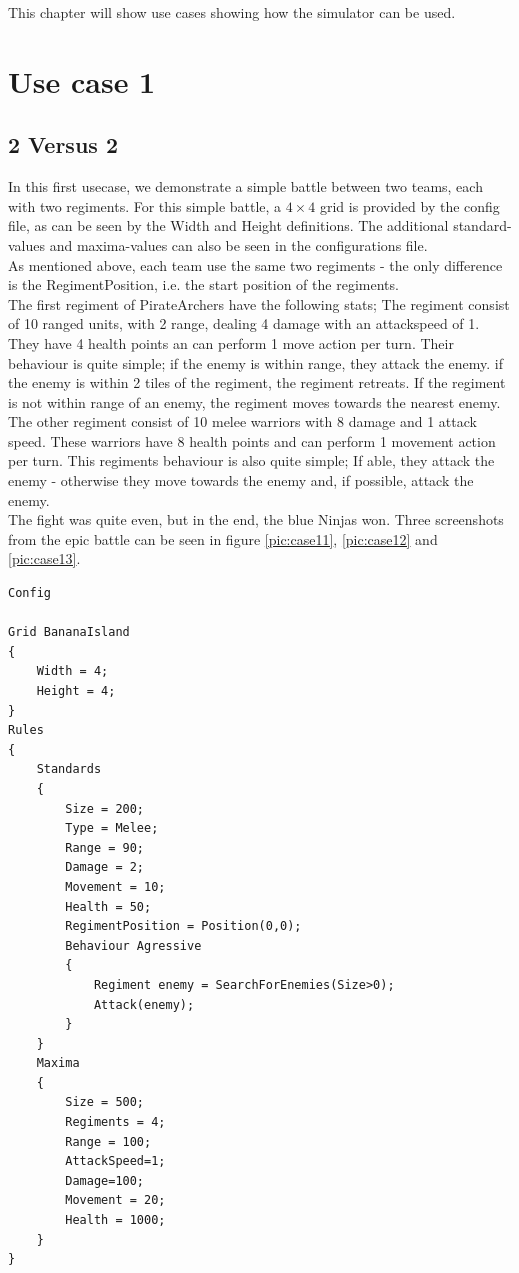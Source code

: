 This chapter will show use cases showing how the simulator can be used.

\section{Use case 1}\label{sec:usecase1}
	\subsection*{2 Versus 2}
	In this first usecase, we demonstrate a simple battle between two teams, each with two regiments. For this simple battle, a $4\times4$ grid is provided by the config file, as can be seen by the Width and Height definitions. The additional standard-values and maxima-values can also be seen in the configurations file.\\
	As mentioned above, each team use the same two regiments - the only difference is the RegimentPosition, i.e. the start position of the regiments. \\
	The first regiment of PirateArchers have the following stats; The regiment consist of 10 ranged units, with 2 range, dealing 4 damage with an attackspeed of 1. They have 4 health points an can perform 1 move action per turn. Their behaviour is quite simple; if the enemy is within range, they attack the enemy. if the enemy is within 2 tiles of the regiment, the regiment retreats. If the regiment is not within range of an enemy, the regiment moves towards the nearest enemy.\\
	The other regiment consist of 10 melee warriors with 8 damage and 1 attack speed. These warriors have 8 health points and can perform 1 movement action per turn. This regiments behaviour is also quite simple; If able, they attack the enemy - otherwise they move towards the enemy and, if possible, attack the enemy.\\
	The fight was quite even, but in the end, the blue Ninjas won. Three screenshots from the epic battle can be seen in figure \ref{pic:case11}, \ref{pic:case12} and \ref{pic:case13}.
\begin{lstlisting}
Config

Grid BananaIsland
{
	Width = 4;
	Height = 4;
}
Rules
{
	Standards
	{
		Size = 200;
		Type = Melee;
		Range = 90;
		Damage = 2;
		Movement = 10;
		Health = 50;
		RegimentPosition = Position(0,0);
		Behaviour Agressive
		{
			Regiment enemy = SearchForEnemies(Size>0);
			Attack(enemy);
		}
	}
	Maxima
	{
		Size = 500;
		Regiments = 4;
		Range = 100;
		AttackSpeed=1;
		Damage=100;
		Movement = 20;
		Health = 1000;
	}
}
\end{lstlisting}
